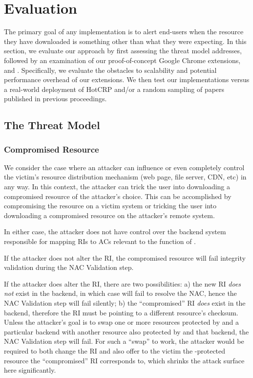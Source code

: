 \section{Evaluation} \label{sec:evaluation}

The primary goal of any \SYSTEM{} implementation is to alert end-users when the
resource they have downloaded is something other than what they were expecting.
In this section, we evaluate our approach by first assessing the threat model
\SYSTEM{} addresses, followed by an examination of our proof-of-concept Google
Chrome extensions, \DNSSYS{} and \DHTSYS{}. Specifically, we evaluate the
obstacles to scalability and potential performance overhead of our extensions.
We then test our implementations versus a real-world deployment of HotCRP and/or
a random sampling of papers published in previous \CONFERENCE{} proceedings.

\subsection{The Threat Model}

\subsubsection{Compromised Resource}

We consider the case where an attacker can influence or even completely control
the victim's resource distribution mechanism (web page, file server, CDN, etc)
in any way. In this context, the attacker can trick the user into downloading a
compromised resource of the attacker's choice. This can be accomplished by
compromising the resource on a victim system or tricking the user into
downloading a compromised resource on the attacker's remote system.

In either case, the attacker does not have control over the backend system
responsible for mapping RIs to ACs relevant to the function of \SYSTEM{}.

If the attacker does not alter the RI, the compromised resource will fail
integrity validation during the NAC Validation step.

If the attacker does alter the RI, there are two possibilities: a) the new RI
\textit{does not} exist in the backend, in which case \SYSTEM{} will fail to
resolve the NAC, hence the NAC Validation step will fail silently; b) the
``compromised'' RI \textit{does} exist in the backend, therefore the RI must be
pointing to a different resource's checksum. Unless the attacker's goal is to
swap one or more resources protected by \SYSTEM{} and a particular backend with
another resource also protected by \SYSTEM{} and that backend, the NAC
Validation step will fail. For such a ``swap'' to work, the attacker would be
required to both change the RI and also offer to the victim the
\SYSTEM{}-protected resource the ``compromised'' RI corresponds to, which
shrinks the attack surface here significantly.

